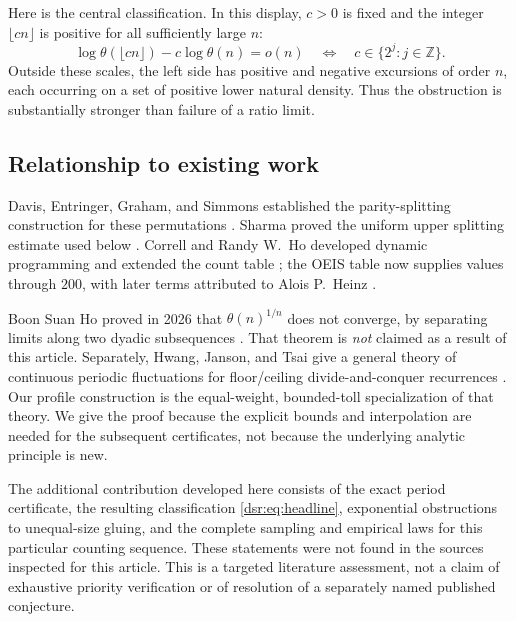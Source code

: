 \documentclass[11pt,a4paper]{article}
\numberwithin{equation}{section}
\theoremstyle{definition}
\theoremstyle{remark}
\newcommand{\Z}{\mathbb Z}
\theoremstyle{definition}
\theoremstyle{plain}
\begin{document}
Here is the central classification. In this display, $c>0$ is fixed and the
integer $\lfloor cn\rfloor$ is positive for all sufficiently large $n$:
\begin{equation}
\boxed{\quad
 \log\theta(\lfloor cn\rfloor)-c\log\theta(n)=o(n)
 \quad\Longleftrightarrow\quad c\in\{2^j:j\in\Z\}.
 \quad}
\label{dsr:eq:headline}
\end{equation}
Outside these scales, the left side has positive and negative excursions of
order $n$, each occurring on a set of positive lower natural density. Thus the
obstruction is substantially stronger than failure of a ratio limit.

\subsection{Relationship to existing work}
Davis, Entringer, Graham, and Simmons established the parity-splitting
construction for these permutations \cite{DEGS}. Sharma proved the uniform
upper splitting estimate used below \cite[Theorem 2.8]{Sharma}. Correll and
Randy W.~Ho developed dynamic programming and extended the count table
\cite{CorrellHo}; the OEIS table now supplies values through $200$, with later
terms attributed to Alois P.~Heinz \cite{OEIS}.

Boon Suan Ho proved in 2026 that $\theta(n)^{1/n}$ does not converge, by
separating limits along two dyadic subsequences \cite{Ho}. That theorem is
\emph{not} claimed as a result of this article. Separately, Hwang, Janson, and
Tsai give a general theory of continuous periodic fluctuations for
floor/ceiling divide-and-conquer recurrences \cite[Theorem 2.10]{HJT}. Our
profile construction is the equal-weight, bounded-toll specialization of that
theory. We give the proof because the explicit bounds and interpolation are
needed for the subsequent certificates, not because the underlying analytic
principle is new.

The additional contribution developed here consists of the exact period
certificate, the resulting classification \eqref{dsr:eq:headline}, exponential
obstructions to unequal-size gluing, and the complete sampling and empirical
laws for this particular counting sequence. These statements were not found
in the sources inspected for this article. This is a targeted literature
assessment, not a claim of exhaustive priority verification or of resolution
of a separately named published conjecture.
\end{document}
